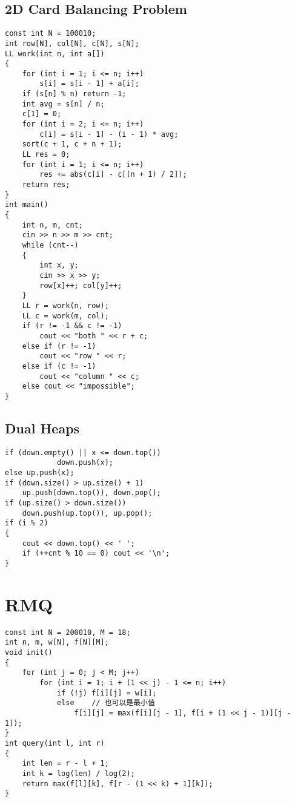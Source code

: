 \subsection{2D Card Balancing Problem}
\begin{lstlisting}
const int N = 100010;
int row[N], col[N], c[N], s[N];
LL work(int n, int a[])
{
    for (int i = 1; i <= n; i++)
        s[i] = s[i - 1] + a[i];
    if (s[n] % n) return -1;
    int avg = s[n] / n;
    c[1] = 0;
    for (int i = 2; i <= n; i++)
        c[i] = s[i - 1] - (i - 1) * avg;
    sort(c + 1, c + n + 1);
    LL res = 0;
    for (int i = 1; i <= n; i++)
        res += abs(c[i] - c[(n + 1) / 2]);
    return res;
}
int main()
{
    int n, m, cnt;
    cin >> n >> m >> cnt;
    while (cnt--)
    {
        int x, y;
        cin >> x >> y;
        row[x]++; col[y]++;
    }
    LL r = work(n, row);
    LL c = work(m, col);
    if (r != -1 && c != -1)
        cout << "both " << r + c;
    else if (r != -1)
        cout << "row " << r;
    else if (c != -1)
        cout << "column " << c;
    else cout << "impossible";
}
\end{lstlisting}
\subsection{Dual Heaps}
\begin{lstlisting}
if (down.empty() || x <= down.top())
            down.push(x);
else up.push(x);
if (down.size() > up.size() + 1)
    up.push(down.top()), down.pop();
if (up.size() > down.size())
    down.push(up.top()), up.pop();
if (i % 2)
{
    cout << down.top() << ' ';
    if (++cnt % 10 == 0) cout << '\n';
}
\end{lstlisting}
\section{RMQ}
\begin{lstlisting}
const int N = 200010, M = 18;
int n, m, w[N], f[N][M];
void init()
{
    for (int j = 0; j < M; j++)
        for (int i = 1; i + (1 << j) - 1 <= n; i++)
            if (!j) f[i][j] = w[i];
            else    // 也可以是最小值
                f[i][j] = max(f[i][j - 1], f[i + (1 << j - 1)][j - 1]);
}
int query(int l, int r)
{
    int len = r - l + 1;
    int k = log(len) / log(2);
    return max(f[l][k], f[r - (1 << k) + 1][k]);
}
\end{lstlisting}